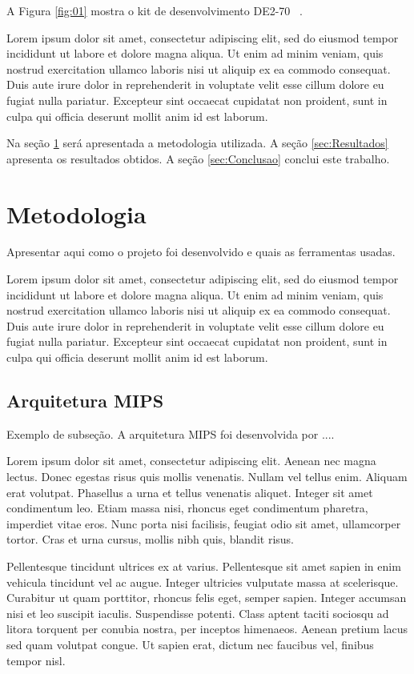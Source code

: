 \documentclass[a4paper]{sbgames}
\begin{document}
A Figura \ref{fig:01} mostra o kit de desenvolvimento DE2-70  ~\cite{Alt}.

Lorem ipsum dolor sit amet, consectetur adipiscing elit, sed do eiusmod tempor incididunt ut labore et dolore magna aliqua. Ut enim ad minim veniam, quis nostrud exercitation ullamco laboris nisi ut aliquip ex ea commodo consequat. Duis aute irure dolor in reprehenderit in voluptate velit esse cillum dolore eu fugiat nulla pariatur. Excepteur sint occaecat cupidatat non proident, sunt in culpa qui officia deserunt mollit anim id est laborum.

Na seção \ref{sec:Metodologia} será apresentada a metodologia utilizada. A seção \ref{sec:Resultados} apresenta os resultados obtidos. A seção \ref{sec:Conclusao} conclui este trabalho.

\section{Metodologia}
\label{sec:Metodologia}

Apresentar aqui como o projeto foi desenvolvido e quais as ferramentas usadas.

Lorem ipsum dolor sit amet, consectetur adipiscing elit, sed do eiusmod tempor incididunt ut labore et dolore magna aliqua. Ut enim ad minim veniam, quis nostrud exercitation ullamco laboris nisi ut aliquip ex ea commodo consequat. Duis aute irure dolor in reprehenderit in voluptate velit esse cillum dolore eu fugiat nulla pariatur. Excepteur sint occaecat cupidatat non proident, sunt in culpa qui officia deserunt mollit anim id est laborum.



\subsection{Arquitetura MIPS}{
\label{sec:MIPS}
Exemplo de subseção. A arquitetura MIPS \cite{patterson2005organizaccao} foi desenvolvida por ....


Lorem ipsum dolor sit amet, consectetur adipiscing elit. Aenean nec magna lectus. Donec egestas risus quis mollis venenatis. Nullam vel tellus enim. Aliquam erat volutpat. Phasellus a urna et tellus venenatis aliquet. Integer sit amet condimentum leo. Etiam massa nisi, rhoncus eget condimentum pharetra, imperdiet vitae eros. Nunc porta nisi facilisis, feugiat odio sit amet, ullamcorper tortor. Cras et urna cursus, mollis nibh quis, blandit risus.

Pellentesque tincidunt ultrices ex at varius. Pellentesque sit amet sapien in enim vehicula tincidunt vel ac augue. Integer ultricies vulputate massa at scelerisque. Curabitur ut quam porttitor, rhoncus felis eget, semper sapien. Integer accumsan nisi et leo suscipit iaculis. Suspendisse potenti. Class aptent taciti sociosqu ad litora torquent per conubia nostra, per inceptos himenaeos. Aenean pretium lacus sed quam volutpat congue. Ut sapien erat, dictum nec faucibus vel, finibus tempor nisl. 
}
\end{document}
